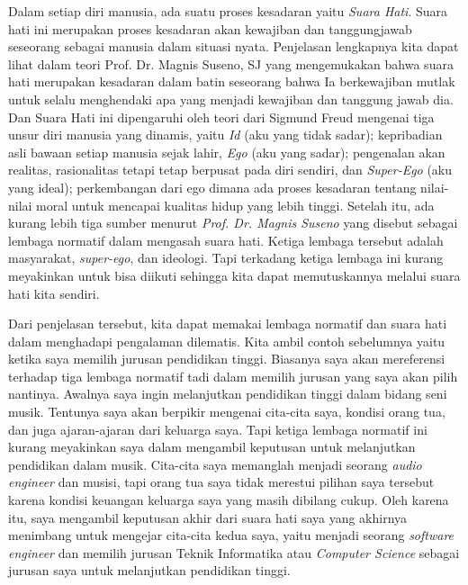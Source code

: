 \documentclass[
  11pt,
  answers  
]{exam}
\begin{document}
\begin{questions}
\begin{solution}
        Dalam setiap diri manusia, ada suatu proses kesadaran yaitu \emph{Suara Hati}. Suara hati ini merupakan proses kesadaran
        akan kewajiban dan tanggungjawab seseorang sebagai manusia dalam situasi nyata. Penjelasan lengkapnya kita dapat lihat
        dalam teori Prof. Dr. Magnis Suseno, SJ yang mengemukakan bahwa suara hati merupakan kesadaran dalam batin seseorang bahwa
        Ia berkewajiban mutlak untuk selalu menghendaki apa yang menjadi kewajiban dan tanggung jawab dia. Dan Suara Hati ini dipengaruhi
        oleh teori dari Sigmund Freud mengenai tiga unsur diri manusia yang dinamis, yaitu \emph{Id} (aku yang tidak sadar); kepribadian
        asli bawaan setiap manusia sejak lahir, \emph{Ego} (aku yang sadar); pengenalan akan realitas, rasionalitas tetapi tetap berpusat
        pada diri sendiri, dan \emph{Super-Ego} (aku yang ideal); perkembangan dari ego dimana ada proses kesadaran tentang nilai-nilai
        moral untuk mencapai kualitas hidup yang lebih tinggi. Setelah itu, ada kurang lebih tiga sumber menurut \emph{Prof. Dr. Magnis 
        Suseno} yang disebut sebagai lembaga normatif dalam mengasah suara hati. Ketiga lembaga tersebut adalah masyarakat, \emph{super-ego},
        dan ideologi. Tapi terkadang ketiga lembaga ini kurang meyakinkan untuk bisa diikuti sehingga kita dapat memutuskannya melalui suara hati
        kita sendiri.

        Dari penjelasan tersebut, kita dapat memakai lembaga normatif dan suara hati dalam menghadapi pengalaman dilematis. Kita ambil contoh
        sebelumnya yaitu ketika saya memilih jurusan pendidikan tinggi. Biasanya saya akan mereferensi terhadap tiga lembaga normatif tadi dalam memilih 
        jurusan yang saya akan pilih nantinya. Awalnya saya ingin melanjutkan pendidikan tinggi dalam bidang seni musik. Tentunya saya akan berpikir mengenai
        cita-cita saya, kondisi orang tua, dan juga ajaran-ajaran dari keluarga saya. Tapi ketiga lembaga normatif ini kurang meyakinkan saya dalam mengambil
        keputusan untuk melanjutkan pendidikan dalam musik. Cita-cita saya memanglah menjadi seorang \emph{audio engineer} dan musisi, tapi orang tua saya
        tidak merestui pilihan saya tersebut karena kondisi keuangan keluarga saya yang masih dibilang cukup. Oleh karena itu, saya mengambil keputusan akhir
        dari suara hati saya yang akhirnya menimbang untuk mengejar cita-cita kedua saya, yaitu menjadi seorang \emph{software engineer} dan memilih jurusan
        Teknik Informatika atau \emph{Computer Science} sebagai jurusan saya untuk melanjutkan pendidikan tinggi.

      \end{solution}
    \end{questions}
    \pagebreak

		
\end{document}
